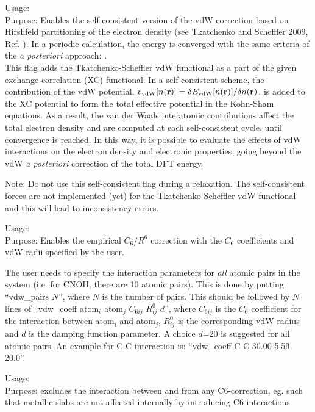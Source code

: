 {	
  \noindent
  Usage:  \\[1.0ex]
  Purpose: Enables the self-consistent version of the vdW correction based on Hirshfeld partitioning
  of the electron density (see Tkatchenko and Scheffler
  2009, Ref. \cite{TS-vdw}). In a periodic calculation, the energy is converged with the same criteria of the \textit{a posteriori} approach: . \\[1.0ex]
}
This flag adds the Tkatchenko-Scheffler vdW functional as a part of the given exchange-correlation (XC) functional.
In a self-consistent scheme, the contribution of the vdW potential, $v_{\rm vdW}[n({\bf r})]=\delta E_{\rm vdW}[n({\bf r})]/\delta n({\bf r})$, is added to the XC potential to form the total effective potential in the Kohn-Sham equations.
As a result, the van der Waals interatomic contributions affect the total electron density and are computed at each self-consistent cycle, until convergence is reached.
In this way, it is possible to evaluate the effects of vdW interactions on the electron density and electronic properties, going beyond the vdW \textit{a posteriori} correction of the total DFT energy.

Note: Do not use this self-consistent flag during a relaxation. The self-consistent forces are not implemented (yet) for the Tkatchenko-Scheffler vdW functional and this will lead to inconsistency errors.

{
  \noindent
  Usage:  \\[1.0ex]
  Purpose: Enables the empirical $C_6$/$R^6$ correction with the $C_6$ coefficients
and vdW radii specified by the user. \\[1.0ex]
}

The user needs to specify the interaction parameters for \emph{all} atomic pairs in the system
(i.e. for CNOH, there are 10 atomic pairs). This is done by putting ``vdw\_pairs $N$'', where
$N$ is the number of pairs. This should be followed by $N$ lines 
of ``vdw\_coeff atom$_i$ atom$_j$ $C_{6ij}$ $R^0_{ij}$ $d$'', where 
$C_{6ij}$ is the $C_6$ coefficient for the interaction between atom$_i$ and atom$_j$,
$R^0_{ij}$ is the corresponding vdW radius and $d$ is the damping function parameter.
A choice $d$=20 is suggested for all atomic pairs. An example for C-C interaction
is: ``vdw\_coeff C C 30.00 5.59 20.0''.

{
  \noindent
  Usage:    \\[1.0ex]
  Purpose: excludes the interaction between  and  from any C6-correction, eg. such that metallic slabs 
  are not affected internally by introducing C6-interactions. \\[1.0ex]
}


